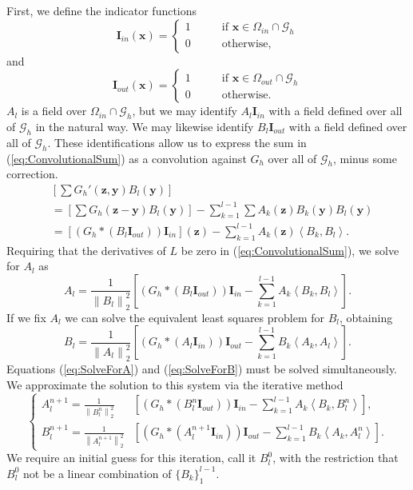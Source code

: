 \documentclass[preprint,12pt]{elsarticle}
\newcommand{\norm}[1]{\left\lVert#1\right\rVert}
\newcommand{\B}[1]{\mathbf{#1}}
\newcommand{\C}[1]{\mathcal{#1}}
\newcommand{\LL}{\left\langle}
\newcommand{\RR}{\right\rangle}
\begin{document}
First, we define the indicator functions
\begin{equation}
\B{\B{I}}_{in}(\B{x}) = \begin{cases}
1 \qquad &\text{if $\B{x} \in \Omega_{in}\cap\C{G}_h$} \\
0 \qquad &\text{otherwise}, \end{cases}
\end{equation}
and
\begin{equation}
\B{\B{I}}_{out}(\B{x}) = \begin{cases}
1 \qquad &\text{if $\B{x} \in \Omega_{out}\cap\C{G}_h$} \\
0 \qquad &\text{otherwise}. \end{cases}
\end{equation}
$A_l$ is a field over $\Omega_{in}\cap\C{G}_h$, but we may identify $A_l\B{\B{I}}_{in}$ with a field defined over all of $\C{G}_h$ in the natural way. We may likewise identify $B_l\B{\B{I}}_{out}$ with a field defined over all of $\C{G}_h$. These identifications allow us to express the sum in (\ref{eq:ConvolutionalSum}) as a convolution against $G_h$ over all of $\C{G}_h$, minus some correction.
\begin{align}
&\left[ \sum G_h'(\B{z},\B{y})B_l(\B{y}) \right] \nonumber \\
&= 
\left[ \sum G_h(\B{z} - \B{y})B_l(\B{y}) \right] -
\sum_{k = 1}^{l-1} \sum A_k(\B{z}) B_k(\B{y}) B_l(\B{y}) \\
&=
\left[(G_h*(B_l\B{I}_{out}))\B{I}_{in}\right](\B{z}) -
\sum_{k = 1}^{l-1} A_k(\B{z}) \LL B_k, B_l \RR. \nonumber
\end{align}
Requiring that the derivatives of $L$ be zero in (\ref{eq:ConvolutionalSum}), we solve for $A_l$ as
\begin{equation}
A_l = \frac{1}{\norm{B_l}_2^2}
\left[
(G_h*(B_l\B{I}_{out}))\B{I}_{in}
- \sum_{k = 1}^{l-1} A_k \LL B_k, B_l \RR
\right].
\label{eq:SolveForA}
\end{equation}
If we fix $A_l$ we can solve the equivalent least squares problem for $B_l$, obtaining
\begin{equation}
B_l = \frac{1}{\norm{A_l}_2^2}
\left[
(G_h*(A_l\B{I}_{in}))\B{I}_{out}
- \sum_{k = 1}^{l-1} B_k \LL A_k, A_l \RR
\right].
\label{eq:SolveForB}
\end{equation}
Equations (\ref{eq:SolveForA}) and (\ref{eq:SolveForB}) must be solved simultaneously. We approximate the solution to this system via the iterative method
\begin{equation}
\left\{
\begin{aligned}
A_l^{n+1} = \frac{1}{\norm{B_l^n}_2^2}
&\left[
(G_h*(B_l^n\B{I}_{out}))\B{I}_{in}
- \sum_{k = 1}^{l-1} A_k \LL B_k, B_l^n \RR
\right], \\
B_l^{n+1} = \frac{1}{\norm{A_l^{n+1}}_2^2}
&\left[
(G_h*(A_l^{n+1}\B{I}_{in}))\B{I}_{out}
- \sum_{k = 1}^{l-1} B_k \LL A_k, A_l^n \RR
\right].
\label{eq:PowerMethod}
\end{aligned}
\right.
\end{equation}
We require an initial guess for this iteration, call it $B_l^0$, with the restriction that $B_l^0$ not be a linear combination of $\{B_k\}_1^{l-1}$.
\end{document}
